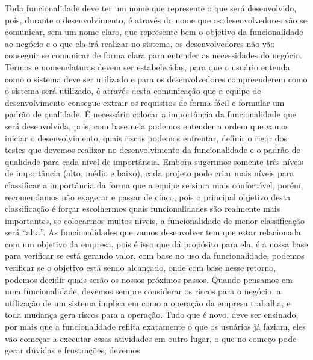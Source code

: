       Toda funcionalidade deve ter um nome que represente o que será desenvolvido,
      pois, durante o desenvolvimento, é através do nome que os desenvolvedores
      vão se comunicar, sem um nome claro, que represente bem o objetivo da
      funcionalidade ao negócio e o que ela irá realizar no sistema, os desenvolvedores
      não vão conseguir se comunicar de forma clara para entender as necessidades
      do negócio. Termos e nomenclaturas devem ser estabelecidas, para que o usuário
      entenda como o sistema deve ser utilizado e para os desenvolvedores compreenderem
      como o sistema será utilizado, é através desta comunicação que a equipe de
      desenvolvimento consegue extrair os requisitos de forma fácil e formular um
      padrão de qualidade. \newline
      É necessário colocar a importância da funcionalidade que será desenvolvida, pois,
      com base nela podemos entender a ordem que vamos iniciar o desenvolvimento,
      quais riscos podemos enfrentar, definir o rigor dos testes que devemos realizar
      no desenvolvimento da funcionalidade e o padrão de qualidade para cada nível
      de importância. Embora sugerimos somente três níveis de importância (alto,
      médio e baixo), cada projeto pode criar mais níveis para classificar a
      importância da forma que a equipe se sinta mais confortável, porém, recomendamos
      não exagerar e passar de cinco, pois o principal objetivo desta classificação
      é forçar escolhermos quais funcionalidades são realmente mais importantes,
      se colocarmos muitos níveis, a funcionalidade de menor classificação será
      “alta”. \newline
      As funcionalidades que vamos desenvolver tem que estar relacionada com um
      objetivo da empresa, pois é isso que dá propósito para ela, é a nossa base
      para verificar se está gerando valor, com base no uso da funcionalidade,
      podemos verificar se o objetivo está sendo alcançado, onde com base nesse
      retorno, podemos decidir quais serão os nossos próximos passos. \newline
      Quando pensamos em uma funcionalidade, devemos sempre considerar os riscos
      para o negócio, a utilização de um sistema implica em como a operação da
      empresa trabalha, e toda mudança gera riscos para a operação. Tudo que é
      novo, deve ser ensinado, por mais que a funcionalidade reflita exatamente o
      que os usuários já faziam, eles vão começar a executar essas atividades em
      outro lugar, o que no começo pode gerar dúvidas e frustrações, devemos
